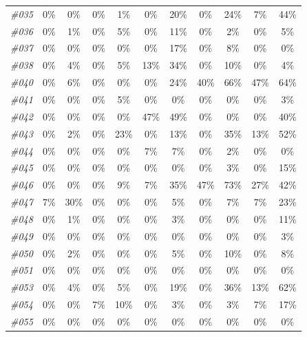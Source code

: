 \begin{table}[t]
\begin{tabular}{ccccccccccc}
    \textit{\#035} & 0\%   & 0\%   & 0\%   & 1\%   & 0\%   & 20\%  & 0\%   & 24\%  & 7\%   & 44\% \\
    \textit{\#036} & 0\%   & 1\%   & 0\%   & 5\%   & 0\%   & 11\%  & 0\%   & 2\%   & 0\%   & 5\% \\
    \textit{\#037} & 0\%   & 0\%   & 0\%   & 0\%   & 0\%   & 17\%  & 0\%   & 8\%   & 0\%   & 0\% \\
    \textit{\#038} & 0\%   & 4\%   & 0\%   & 5\%   & 13\%  & 34\%  & 0\%   & 10\%  & 0\%   & 4\% \\
    \textit{\#040} & 0\%   & 6\%   & 0\%   & 0\%   & 0\%   & 24\%  & 40\%  & 66\%  & 47\%  & 64\% \\
    \textit{\#041} & 0\%   & 0\%   & 0\%   & 5\%   & 0\%   & 0\%   & 0\%   & 0\%   & 0\%   & 3\% \\
    \textit{\#042} & 0\%   & 0\%   & 0\%   & 0\%   & 47\%  & 49\%  & 0\%   & 0\%   & 0\%   & 40\% \\
    \textit{\#043} & 0\%   & 2\%   & 0\%   & 23\%  & 0\%   & 13\%  & 0\%   & 35\%  & 13\%  & 52\% \\
    \textit{\#044} & 0\%   & 0\%   & 0\%   & 0\%   & 7\%   & 7\%   & 0\%   & 2\%   & 0\%   & 0\% \\
    \textit{\#045} & 0\%   & 0\%   & 0\%   & 0\%   & 0\%   & 0\%   & 0\%   & 3\%   & 0\%   & 15\% \\
    \textit{\#046} & 0\%   & 0\%   & 0\%   & 9\%   & 7\%   & 35\%  & 47\%  & 73\%  & 27\%  & 42\% \\
    \textit{\#047} & 7\%   & 30\%  & 0\%   & 0\%   & 0\%   & 5\%   & 0\%   & 7\%   & 7\%   & 23\% \\
    \textit{\#048} & 0\%   & 1\%   & 0\%   & 0\%   & 0\%   & 3\%   & 0\%   & 0\%   & 0\%   & 11\% \\
    \textit{\#049} & 0\%   & 0\%   & 0\%   & 0\%   & 0\%   & 0\%   & 0\%   & 0\%   & 0\%   & 3\% \\
    \textit{\#050} & 0\%   & 2\%   & 0\%   & 0\%   & 0\%   & 5\%   & 0\%   & 10\%  & 0\%   & 8\% \\
    \textit{\#051} & 0\%   & 0\%   & 0\%   & 0\%   & 0\%   & 0\%   & 0\%   & 0\%   & 0\%   & 0\% \\
    \textit{\#053} & 0\%   & 4\%   & 0\%   & 5\%   & 0\%   & 19\%  & 0\%   & 36\%  & 13\%  & 62\% \\
    \textit{\#054} & 0\%   & 0\%   & 7\%   & 10\%  & 0\%   & 3\%   & 0\%   & 3\%   & 7\%   & 17\% \\
    \textit{\#055} & 0\%   & 0\%   & 0\%   & 0\%   & 0\%   & 0\%   & 0\%   & 0\%   & 0\%   & 0\% \\
    \bottomrule
    \end{tabular}%
  \label{tab:exp_a2d_1}%
\end{table}%

